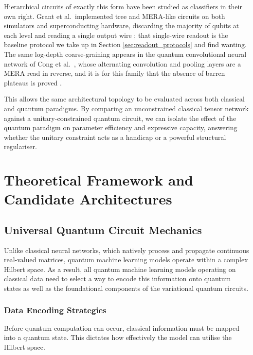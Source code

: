 \documentclass[12pt, a4paper, oneside]{report}
\begin{document}
Hierarchical circuits of exactly this form have been studied as classifiers in their own right. Grant et al.\ implemented tree and MERA-like circuits on both simulators and superconducting hardware, discarding the majority of qubits at each level and reading a single output wire \cite{grant2018hierarchical}; that single-wire readout is the baseline protocol we take up in Section \ref{sec:readout_protocols} and find wanting. The same log-depth coarse-graining appears in the quantum convolutional neural network of Cong et al.\ \cite{cong2019qcnn}, whose alternating convolution and pooling layers are a MERA read in reverse, and it is for this family that the absence of barren plateaus is proved \cite{pesah2021_qcnn}.

This allows the same architectural topology to be evaluated across both classical and quantum paradigms. By comparing an unconstrained classical tensor network against a unitary-constrained quantum circuit, we can isolate the effect of the quantum paradigm on parameter efficiency and expressive capacity, answering whether the unitary constraint acts as a handicap or a powerful structural regulariser.


\chapter{Theoretical Framework and Candidate Architectures}
\label{ch:theory}

\section{Universal Quantum Circuit Mechanics}

Unlike classical neural networks, which natively process and propagate continuous real-valued matrices, quantum machine learning models operate within a complex Hilbert space. As a result, all quantum machine learning models operating on classical data need to select a way to encode this information onto quantum states as well as the foundational components of the variational quantum circuits.

\subsection{Data Encoding Strategies}
Before quantum computation can occur, classical information must be mapped into a quantum state. This dictates how effectively the model can utilise the Hilbert space.
\end{document}
